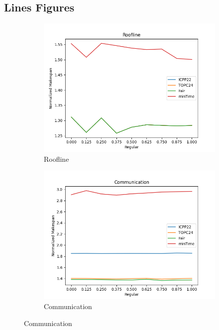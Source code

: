 \documentclass{article}
\begin{document}
\subsection{Lines Figures}
\begin{figure}[htbp]
\centering
\begin{subfigure}[b]{0.32\textwidth}\includegraphics[width=\textwidth]{Results/Regular/Regular_Roofline}\caption{Roofline}\label{fig:lines_figures_Regular_Roofline}\end{subfigure}
\hfill
\begin{subfigure}[b]{0.32\textwidth}\includegraphics[width=\textwidth]{Results/Regular/Regular_Communication}\caption{Communication}\label{fig:lines_figures_Regular_Communication}\end{subfigure}

\end{figure}
\end{document}
